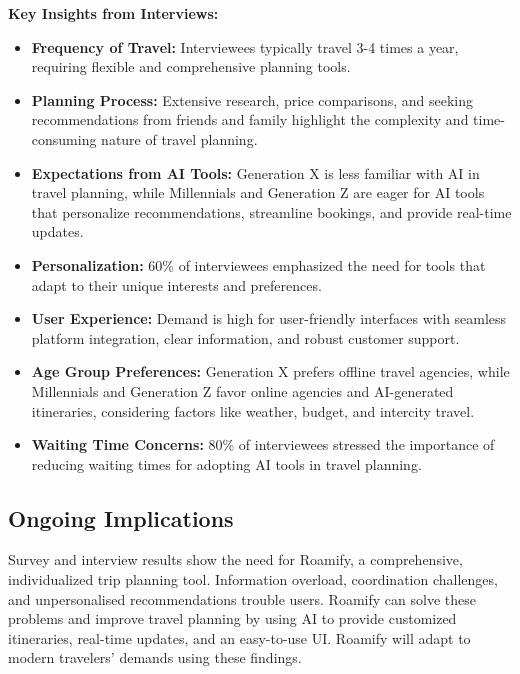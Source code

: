 \documentclass[conference]{IEEEtran}
\begin{document}
        \textbf{Key Insights from Interviews:}
        \begin{itemize}
            \item \textbf{Frequency of Travel:} Interviewees typically travel 3-4 times a year, requiring flexible and comprehensive planning tools.
            \item \textbf{Planning Process:} Extensive research, price comparisons, and seeking recommendations from friends and family highlight the complexity and time-consuming nature of travel planning.
            \item \textbf{Expectations from AI Tools:} Generation X is less familiar with AI in travel planning, while Millennials and Generation Z are eager for AI tools that personalize recommendations, streamline bookings, and provide real-time updates.
            \item \textbf{Personalization:} 60\% of interviewees emphasized the need for tools that adapt to their unique interests and preferences.
            \item \textbf{User Experience:} Demand is high for user-friendly interfaces with seamless platform integration, clear information, and robust customer support.
            \item \textbf{Age Group Preferences:} Generation X prefers offline travel agencies, while Millennials and Generation Z favor online agencies and AI-generated itineraries, considering factors like weather, budget, and intercity travel.
            \item \textbf{Waiting Time Concerns:} 80\% of interviewees stressed the importance of reducing waiting times for adopting AI tools in travel planning.
        \end{itemize}


    \subsection{Ongoing Implications}
        Survey and interview results show the need for Roamify, a comprehensive, individualized trip planning tool. Information overload, coordination challenges, and unpersonalised recommendations trouble users. Roamify can solve these problems and improve travel planning by using AI to provide customized itineraries, real-time updates, and an easy-to-use UI. Roamify will adapt to modern travelers' demands using these findings.


\newpage
\end{document}
